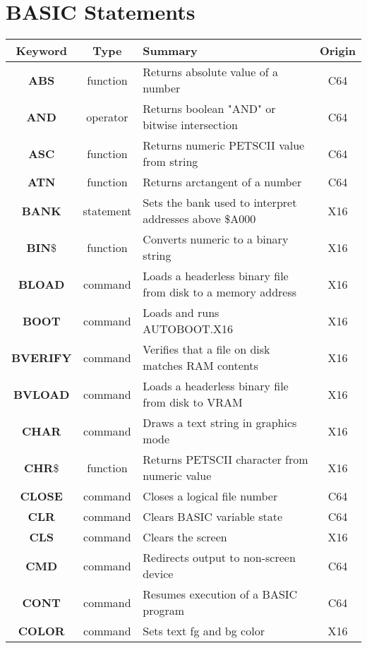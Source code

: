 \chapter{BASIC Statements}

\begin{longtable}{|c|c|m{4cm}|c|}
	\hline
	Keyword & Type & Summary & Origin \\ \hline
	{\bfseries ABS} & function & Returns absolute value of a number & C64 \\ \hline
	{\bfseries AND} & operator & Returns boolean "AND" or bitwise intersection & C64 \\ \hline
	{\bfseries ASC} & function & Returns numeric PETSCII value from string & C64 \\ \hline
	{\bfseries ATN} & function & Returns arctangent of a number & C64 \\ \hline
	{\bfseries BANK} & statement & Sets the bank used to interpret addresses above \$A000 & X16 \\ \hline
	{\bfseries BIN}\$ & function & Converts numeric to a binary string & X16 \\ \hline
	{\bfseries BLOAD} & command & Loads a headerless binary file from disk to a memory address & X16 \\ \hline
	{\bfseries BOOT} & command & Loads and runs {\ttfamily AUTOBOOT.X16} & X16 \\ \hline
	{\bfseries BVERIFY} & command & Verifies that a file on disk matches RAM contents & X16 \\ \hline
	{\bfseries BVLOAD} & command & Loads a headerless binary file from disk to VRAM & X16 \\ \hline
	{\bfseries CHAR} & command & Draws a text string in graphics mode & X16 \\ \hline
	{\bfseries CHR}\$ & function & Returns PETSCII character from numeric value & X16 \\ \hline
	{\bfseries CLOSE} & command & Closes a logical file number & C64 \\ \hline
	{\bfseries CLR} & command & Clears BASIC variable state & C64 \\ \hline
	{\bfseries CLS} & command & Clears the screen & X16 \\ \hline
	{\bfseries CMD} & command & Redirects output to non-screen device & C64 \\ \hline
	{\bfseries CONT} & command & Resumes execution of a BASIC program & C64 \\ \hline
	{\bfseries COLOR} & command & Sets text fg and bg color & X16 \\ \hline

\end{longtable}
